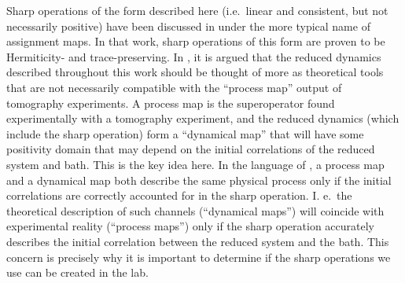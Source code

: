 Sharp operations of the form described here (i.e.\ linear and consistent, but not necessarily positive) have been discussed in \cite{Rodriguez2010} under the more typical name of assignment maps.  In that work, sharp operations of this form are proven to be Hermiticity- and trace-preserving.  In \cite{Sudarshen2007}, it is argued that the reduced dynamics described throughout this work should be thought of more as theoretical tools that are not necessarily compatible with the ``process map'' output of tomography experiments.  A process map is the superoperator found experimentally with a tomography experiment, and the reduced dynamics (which include the sharp operation) form a ``dynamical map'' that will have some positivity domain that may depend on the initial correlations of the reduced system and bath.  This is the key idea here.  In the language of \cite{Sudarshen2007}, a process map and a dynamical map both describe the same physical process only if the initial correlations are correctly accounted for in the sharp operation.  I. e.\ the theoretical description of such channels (``dynamical maps'') will coincide with experimental reality (``process maps'') only if the sharp operation accurately describes the initial correlation between the reduced system and the bath.  This concern is precisely why it is important to determine if the sharp operations we use can be created in the lab.   

